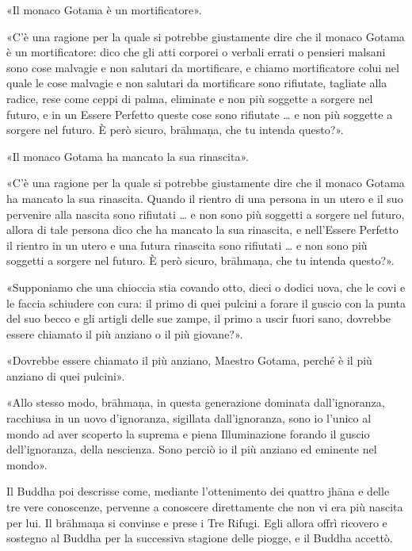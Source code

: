 «Il monaco Gotama è un mortificatore».

«C’è una ragione per la quale si potrebbe giustamente dire che il monaco Gotama
è un mortificatore: dico che gli atti corporei o verbali errati o pensieri
malsani sono cose malvagie e non salutari da mortificare, e chiamo mortificatore
colui nel quale le cose malvagie e non salutari da mortificare sono rifiutate,
tagliate alla radice, rese come ceppi di palma, eliminate e non più soggette a
sorgere nel futuro, e in un Essere Perfetto queste cose sono rifiutate … e non
più soggette a sorgere nel futuro. È però sicuro, brāhmaṇa, che tu intenda
questo?».

«Il monaco Gotama ha mancato la sua rinascita».

«C’è una ragione per la quale si potrebbe giustamente dire che il monaco Gotama
ha mancato la sua rinascita. Quando il rientro di una persona in un utero e il
suo pervenire alla nascita sono rifiutati … e non sono più soggetti a sorgere
nel futuro, allora di tale persona dico che ha mancato la sua rinascita, e
nell’Essere Perfetto il rientro in un utero e una futura rinascita sono
rifiutati … e non sono più soggetti a sorgere nel futuro. È però sicuro,
brāhmaṇa, che tu intenda questo?».

«Supponiamo che una chioccia stia covando otto, dieci o dodici uova, che le covi
e le faccia schiudere con cura: il primo di quei pulcini a forare il guscio con
la punta del suo becco e gli artigli delle sue zampe, il primo a uscir fuori
sano, dovrebbe essere chiamato il più anziano o il più giovane?».

«Dovrebbe essere chiamato il più anziano, Maestro Gotama, perché è il più
anziano di quei pulcini».

«Allo stesso modo, brāhmaṇa, in questa generazione dominata dall’ignoranza,
racchiusa in un uovo d’ignoranza, sigillata dall’ignoranza, sono io l’unico al
mondo ad aver scoperto la suprema e piena Illuminazione forando il guscio
dell’ignoranza, della nescienza. Sono perciò io il più anziano ed eminente nel
mondo».


 Il Buddha poi descrisse come, mediante
l’ottenimento dei quattro jhāna e delle tre vere conoscenze, pervenne a
conoscere direttamente che non vi era più nascita per lui. Il brāhmaṇa si
convinse e prese i Tre Rifugi. Egli allora offrì ricovero e sostegno al Buddha
per la successiva stagione delle piogge, e il Buddha accettò.

